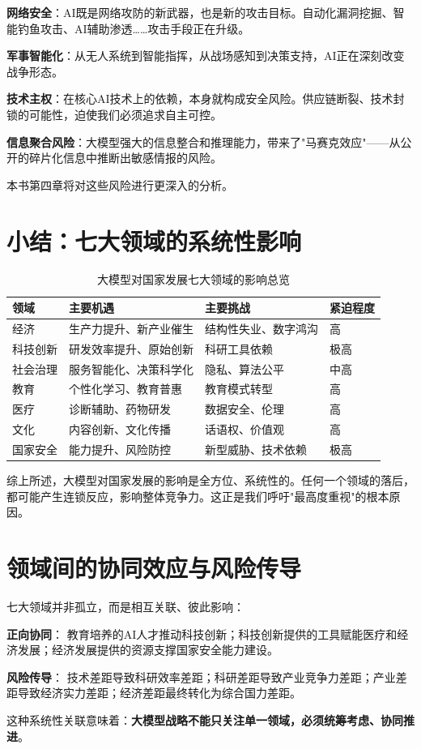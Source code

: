 \textbf{网络安全}：AI既是网络攻防的新武器，也是新的攻击目标。自动化漏洞挖掘、智能钓鱼攻击、AI辅助渗透……攻击手段正在升级。

\textbf{军事智能化}：从无人系统到智能指挥，从战场感知到决策支持，AI正在深刻改变战争形态。

\textbf{技术主权}：在核心AI技术上的依赖，本身就构成安全风险。供应链断裂、技术封锁的可能性，迫使我们必须追求自主可控。

\textbf{信息聚合风险}：大模型强大的信息整合和推理能力，带来了"马赛克效应"——从公开的碎片化信息中推断出敏感情报的风险。

本书第四章将对这些风险进行更深入的分析。

\section{小结：七大领域的系统性影响}

\begin{table}[htbp]
\centering
\caption{大模型对国家发展七大领域的影响总览}
\small
\begin{tabular}{p{2cm}p{4cm}p{4cm}p{3cm}}
\toprule
\textbf{领域} & \textbf{主要机遇} & \textbf{主要挑战} & \textbf{紧迫程度} \\
\midrule
经济 & 生产力提升、新产业催生 & 结构性失业、数字鸿沟 & 高 \\
科技创新 & 研发效率提升、原始创新 & 科研工具依赖 & 极高 \\
社会治理 & 服务智能化、决策科学化 & 隐私、算法公平 & 中高 \\
教育 & 个性化学习、教育普惠 & 教育模式转型 & 高 \\
医疗 & 诊断辅助、药物研发 & 数据安全、伦理 & 高 \\
文化 & 内容创新、文化传播 & 话语权、价值观 & 高 \\
国家安全 & 能力提升、风险防控 & 新型威胁、技术依赖 & 极高 \\
\bottomrule
\end{tabular}
\end{table}

综上所述，大模型对国家发展的影响是全方位、系统性的。任何一个领域的落后，都可能产生连锁反应，影响整体竞争力。这正是我们呼吁"最高度重视"的根本原因。

\section{领域间的协同效应与风险传导}

七大领域并非孤立，而是相互关联、彼此影响：

\textbf{正向协同}：
教育培养的AI人才推动科技创新；科技创新提供的工具赋能医疗和经济发展；经济发展提供的资源支撑国家安全能力建设。

\textbf{风险传导}：
技术差距导致科研效率差距；科研差距导致产业竞争力差距；产业差距导致经济实力差距；经济差距最终转化为综合国力差距。

这种系统性关联意味着：\textbf{大模型战略不能只关注单一领域，必须统筹考虑、协同推进}。
